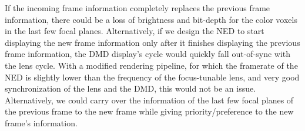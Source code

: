If the incoming frame information completely replaces the previous frame information, there could be a loss of brightness and bit-depth for the color voxels in the last few focal planes. Alternatively, if we design the NED to start displaying the new frame information only after it finishes displaying the previous frame information, the DMD display's cycle would quickly fall out-of-sync with the lens cycle. With a modified rendering pipeline, for which the framerate of the NED is slightly lower than the frequency of the focus-tunable lens, and very good synchronization of the lens and the DMD, this would not be an issue. Alternatively, we could carry over the information of the last few focal planes of the previous frame to the new frame while giving priority/preference to the new frame's information. 

